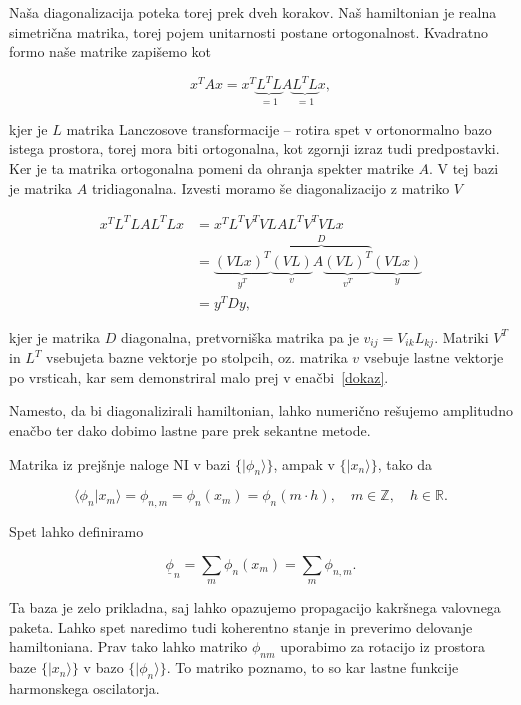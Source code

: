 \documentclass[a4 paper, 12pt]{article}
\begin{document}
Naša diagonalizacija poteka torej prek dveh korakov. Naš hamiltonian je realna simetrična matrika, torej pojem
unitarnosti postane ortogonalnost. Kvadratno formo naše matrike zapišemo kot

\[
	x^TAx = x^T \underbrace{L^T L}_{= 1} A \underbrace{L^T L}_{= 1} x,
\]

kjer je $L$ matrika Lanczosove transformacije -- rotira spet v ortonormalno bazo istega prostora, torej mora biti ortogonalna, kot zgornji
izraz tudi predpostavki. Ker je ta matrika ortogonalna pomeni da ohranja spekter matrike $A$. V tej bazi je matrika $A$ tridiagonalna.
Izvesti moramo še diagonalizacijo z matriko $V$

\begin{align*}
	x^T L^T L A L^T L x &= x^T L^T V^T V L A L^T V^T V L x \\
		&= \underbrace{(VLx)^T}_{y^T} \overbrace{\underbrace{(VL)}_{v} A \underbrace{(VL)^T}_{v^T}}^{D} \underbrace{(VLx)}_{y} \\
		&= y^T D y,
\end{align*}

kjer je matrika $D$ diagonalna, pretvorniška matrika pa je $v_{ij} = V_{ik}L_{kj}$. Matriki $V^T$ in $L^T$ vsebujeta bazne
vektorje po stolpcih, oz. matrika $v$ vsebuje lastne vektorje po vrsticah, kar sem demonstriral malo prej v
enačbi~\eqref{dokaz}.

Namesto, da bi diagonalizirali hamiltonian, lahko numerično rešujemo amplitudno enačbo ter dako dobimo lastne pare prek
sekantne metode.

Matrika iz prejšnje naloge NI v bazi $\big\{|\phi_n\rangle\big\}$, ampak v $\big\{|x_n\rangle\big\}$, tako da

\[
	\langle \phi_n | x_m \rangle = \phi_{n,m} = \phi_n (x_m) = \phi_n (m \cdot h), \quad m \in \mathbb{Z}, \quad h \in \mathbb{R}.
\]

Spet lahko definiramo

\[
	\underline{\phi}_n = \sum_m \phi_n(x_m) = \sum_m \phi_{n,m}.
\]

Ta baza je zelo prikladna, saj lahko opazujemo propagacijo kakršnega valovnega paketa. Lahko spet naredimo tudi koherentno stanje
in preverimo delovanje hamiltoniana. Prav tako lahko matriko $\phi_{nm}$ uporabimo za rotacijo iz prostora baze 
$\big\{|x_n\rangle\big\}$ v bazo $\big\{|\phi_n\rangle\big\}$. To matriko poznamo, to so kar lastne funkcije harmonskega
oscilatorja.
\end{document}

